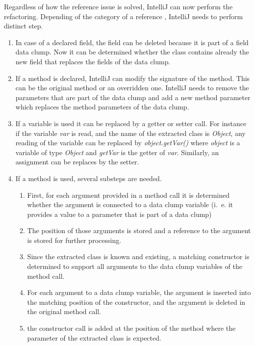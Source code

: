 Regardless of how the reference issue is solved, IntelliJ can now perform the refactoring. Depending of the category of a reference , IntelliJ needs to perform distinct step. 
\begin{enumerate}
    \item In case of a declared field, the field can be deleted because it is part of a field data clump. Now it can be determined whether the class contains already the new field that replaces the fields of the data clump.
    \item If a method is declared, IntelliJ can modify the signature of the method. This can be the original method or an overridden one. IntelliJ needs to remove the parameters that are part of the data clump and add a new method parameter which replaces the method parameters of the data clump. 
    \item If a variable is used it can be replaced by a getter or setter call. For instance if the variable \textit{var} is read, and the name of the extracted class is \textit{Object}, any reading of the variable can be replaced by  \textit{object.getVar()} where \textit{object} is a variable of type \textit{Object} and \textit{getVar} is the getter of \textit{var}. Similarly, an assignment can be replaces by the setter.
    \item If a method is used, several substeps are needed.
    \begin{enumerate}
        \item First, for each argument provided in a method call it is determined whether the argument is connected to a data clump variable (i.~e. it provides a value to a parameter that is part of a data clump) 
        \item The position of those arguments is stored and a reference to the argument is stored for further processing.
        \item Since the extracted class is known and existing, a matching constructor is determined to support all arguments to the data clump variables of the method call. 
        \item For each argument to a data clump variable, the argument is inserted into the matching position of the constructor, and the argument is deleted in the original method call. 
        \item the constructor call is added at the position of the method  where the parameter of the extracted class is expected. 
        
    \end{enumerate}
    
\end{enumerate}

